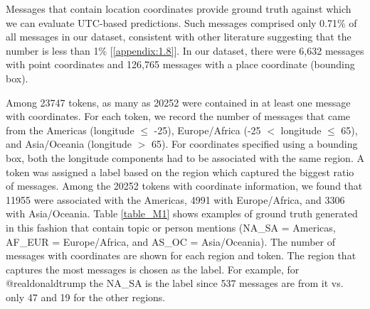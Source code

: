 Messages that contain location coordinates %
provide ground truth against which we can evaluate UTC-based predictions. 
Such messages comprised only 0.71\% of all messages in our dataset, consistent with other literature suggesting that the number is less than 1\% [\ref{appendix:1.8}]. 
In our dataset, there were 6,632 messages with point coordinates and 126,765 messages with a place coordinate (bounding box).  


Among 23747 tokens, as many as 20252 were contained in at least one message with coordinates. 
For each token, we record the number of messages that came from the Americas (longitude $\leq$ -25), Europe/Africa (-25 $<$ longitude $\leq$ 65), and Asia/Oceania (longitude $>$ 65). 
For coordinates specified using a bounding box, both the longitude components had to be associated with the same region. A token was assigned a label based on the region which captured the biggest ratio of messages. 
Among the 20252 tokens with coordinate information, we found that 11955 were associated with the Americas, 4991 with
 Europe/Africa, and 3306 with Asia/Oceania. 
 Table \ref{table_M1} shows examples of ground truth generated in this fashion that contain topic or person mentions (NA\_SA = Americas, AF\_EUR = Europe/Africa, and AS\_OC = Asia/Oceania). The number of messages with coordinates are shown for each region and token. The region that captures the most messages is chosen as the label. For example, for @realdonaldtrump the NA\_SA is the label since 537 messages are from it vs. only 47 and 19 for the other regions.


